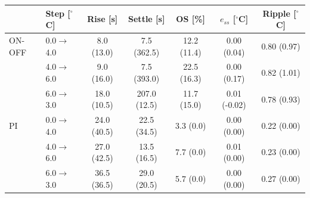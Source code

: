 \begin{tabular}{@{}llccccc@{}}
\toprule
 & Step [$^\circ$C] & Rise [s] & Settle [s] & OS [\%] & $e_{ss}$ [$^\circ$C] & Ripple [$^\circ$C] \\
\midrule
ON-OFF & 0.0$\to$4.0 & 8.0 (13.0) & 7.5 (362.5) & 12.2 (11.4) & 0.00 (0.04) & 0.80 (0.97) \\
 & 4.0$\to$6.0 & 9.0 (16.0) & 7.5 (393.0) & 22.5 (16.3) & 0.00 (0.17) & 0.82 (1.01) \\
 & 6.0$\to$3.0 & 18.0 (10.5) & 207.0 (12.5) & 11.7 (15.0) & 0.01 (-0.02) & 0.78 (0.93) \\
\midrule
PI & 0.0$\to$4.0 & 24.0 (40.5) & 22.5 (34.5) & 3.3 (0.0) & 0.00 (0.00) & 0.22 (0.00) \\
 & 4.0$\to$6.0 & 27.0 (42.5) & 13.5 (16.5) & 7.7 (0.0) & 0.01 (0.00) & 0.23 (0.00) \\
 & 6.0$\to$3.0 & 36.5 (36.5) & 29.0 (20.5) & 5.7 (0.0) & 0.00 (0.00) & 0.27 (0.00) \\
\bottomrule
\end{tabular}
